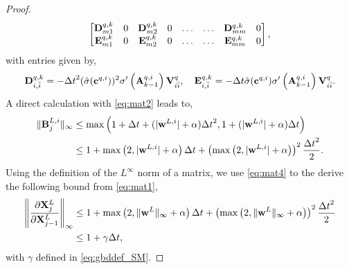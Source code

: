 \documentclass{article}
\newcommand{\bw}{{\bf w}}
\newcommand{\bV}{{\bf V}}
\newcommand{\bA}{{\bf A}}
\newcommand{\bX}{{\bf X}}
\newcommand{\bB}{{\bf B}}
\newcommand{\bc}{{\bf c}}
\newcommand{\Dt}{{\Delta t}}
\newcommand{\bD}{{\bf D}}
\newcommand{\bE}{{\bf E}}
\begin{document}
\begin{proof}
\begin{equation}
\begin{bmatrix}
      \bD^{q,k}_{m1} & 0 & \bD^{q,k}_{m2} & 0 &\ldots &\ldots &\bD^{q,k}_{mm} & 0 \\
     \bE^{q,k}_{m1} & 0 & \bE^{q,k}_{m2} & 0 &\ldots &\ldots &\bE^{q,k}_{mm} & 0
\end{bmatrix},
\end{equation}
with entries given by,
\begin{equation}
    \bD^{q,k}_{i,\bar{i}} = -\Dt^2 (\hat{\sigma}(\bc^{q,i}))^2 \sigma^{\prime}\left(\bA^{q,i}_{k-1}\right)\bV^q_{i\bar{i}}, \quad 
    \bE^{q,k}_{i,\bar{i}} = -\Dt \hat{\sigma}(\bc^{q,i}) \sigma^{\prime}\left(\bA^{q,i}_{k-1}\right)\bV^q_{i\bar{i}}.
\end{equation}
A direct calculation with \eqref{eq:mat2} leads to,
\begin{equation}
    \label{eq:mat4}
    \begin{aligned}
    \|\bB^{L,i}_j \|_{\infty} &\leq \max\left(1 + \Dt +(|\bw^{L,i}|+\alpha)\Dt^2, 1 + (|\bw^{L,i}|+\alpha)\Dt \right) \\
    &\leq 1 + \max\left(2,|\bw^{L,i}|+\alpha\right)\Dt +  \left(\max\left(2,|\bw^{L,i}|+\alpha\right)\right)^2 \frac{\Dt^2}{2}.
    \end{aligned}
\end{equation}
Using the definition of the $L^{\infty}$ norm of a matrix, we use \eqref{eq:mat4} to the derive the following bound from \eqref{eq:mat1},
\begin{equation}
    \label{eq:mat5}
    \begin{aligned}
 \left \|\frac{\partial \bX^L_j}{\partial \bX^L_{j-1}}  \right \|_{\infty} &\leq 1 + \max\left(2,\|\bw^{L}\|_{\infty}+\alpha\right)\Dt +  \left(\max\left(2,\|\bw^{L}\|_{\infty}+\alpha\right)\right)^2 \frac{\Dt^2}{2} \\
 &\leq 1 + \gamma \Dt,
    \end{aligned}
\end{equation}
with $\gamma$ defined in \eqref{eq:gbddef_SM}.



\end{proof}
\end{document}
